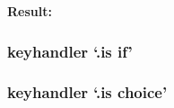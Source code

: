 \documentclass{scrartcl}
\newenvironment{result}
    {\noindent\ignorespaces\textbf{Result:}\newline}
    {\par\noindent\ignorespacesafterend}
\begin{document}
\begin{latex}
\mytext
\end{latex}

\begin{result}
\mytext
\end{result}

\subsubsection{keyhandler `.is if'}

\subsubsection{keyhandler `.is choice'}
\end{document}
